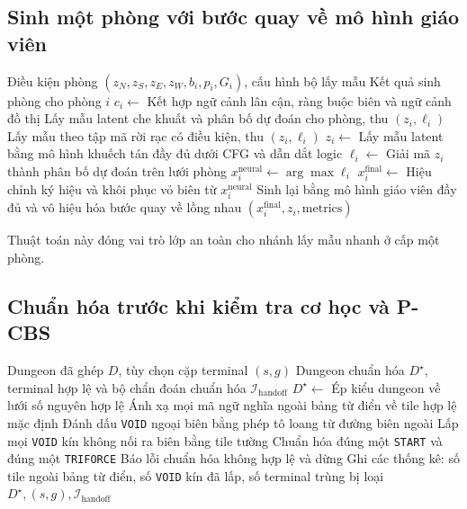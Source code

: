 \documentclass[oneside,a4paper,12pt]{extreport}
\begin{document}
\subsection{Sinh một phòng với bước quay về mô hình giáo viên}
\begin{algorithm}[H]
\caption{Sinh một phòng với bước quay về mô hình giáo viên}
\label{alg:app_generate_room_fallback}
\begin{algorithmic}[1]
\Require Điều kiện phòng $(z_N,z_S,z_E,z_W,b_i,p_i,G_i)$, cấu hình bộ lấy mẫu
\Ensure Kết quả sinh phòng cho phòng $i$
\State $c_i \gets$ Kết hợp ngữ cảnh lân cận, ràng buộc biên và ngữ cảnh đồ thị
  \State Lấy mẫu latent che khuất và phân bố dự đoán cho phòng, thu $(z_i,\ell_i)$
  \State Lấy mẫu theo tập mã rời rạc có điều kiện, thu $(z_i,\ell_i)$
\Else
  \State $z_i \gets$ Lấy mẫu latent bằng mô hình khuếch tán đầy đủ dưới CFG và dẫn dắt logic
  \State $\ell_i \gets$ Giải mã $z_i$ thành phân bố dự đoán trên lưới phòng
\EndIf
\State $x_i^{\text{neural}} \gets \arg\max\ell_i$
\State $x_i^{\text{final}} \gets$ Hiệu chỉnh ký hiệu và khôi phục vỏ biên từ $x_i^{\text{neural}}$
  \State Sinh lại bằng mô hình giáo viên đầy đủ và vô hiệu hóa bước quay về lồng nhau
\EndIf
\State \Return $(x_i^{\text{final}}, z_i, \text{metrics})$
\end{algorithmic}
\end{algorithm}

Thuật toán này đóng vai trò lớp an toàn cho nhánh lấy mẫu nhanh ở cấp một phòng.

\enlargethispage{2\baselineskip}
\subsection{Chuẩn hóa trước khi kiểm tra cơ học và P-CBS}
\begin{algorithm}[H]
\caption{Chuẩn hóa dungeon đã ghép trước khi kiểm tra cơ học và P-CBS}
\label{alg:app_validation_handoff_normalization}
\begin{algorithmic}[1]
\Require Dungeon đã ghép $D$, tùy chọn cặp terminal $(s,g)$
\Ensure Dungeon chuẩn hóa $D^\star$, terminal hợp lệ và bộ chẩn đoán chuẩn hóa $\mathcal{I}_{\mathrm{handoff}}$
\State $D^\star \gets$ Ép kiểu dungeon về lưới số nguyên hợp lệ
\State Ánh xạ mọi mã ngữ nghĩa ngoài bảng từ điển về tile hợp lệ mặc định
\State Đánh dấu \texttt{VOID} ngoại biên bằng phép tô loang từ đường biên ngoài
\State Lấp mọi \texttt{VOID} kín không nối ra biên bằng tile tường
\State Chuẩn hóa đúng một \texttt{START} và đúng một \texttt{TRIFORCE}
  \State Báo lỗi chuẩn hóa không hợp lệ và dừng
\EndIf
\State Ghi các thống kê: số tile ngoài bảng từ điển, số \texttt{VOID} kín đã lấp, số terminal trùng bị loại
\State \Return $D^\star,(s,g),\mathcal{I}_{\mathrm{handoff}}$
\end{algorithmic}
\end{algorithm}
\end{document}

